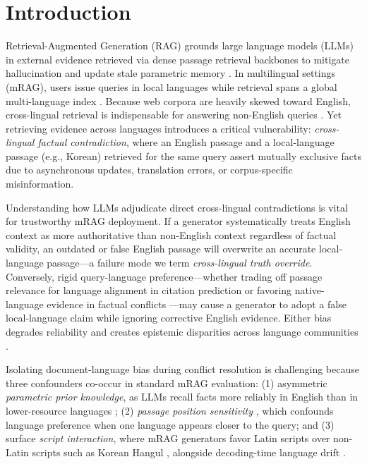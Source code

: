 \section{Introduction}
\label{sec:intro}

Retrieval-Augmented Generation (RAG) grounds large language models (LLMs) in external evidence retrieved via dense passage retrieval backbones \citep{karpukhin2020dense} to mitigate hallucination and update stale parametric memory \citep{lewis2020retrieval}. In multilingual settings (mRAG), users issue queries in local languages while retrieval spans a global multi-language index \citep{asai2021xor,asai2021one,chirkova2024retrieval}. Because web corpora are heavily skewed toward English, cross-lingual retrieval is indispensable for answering non-English queries \citep{wu2024not,liu2025xrag}. Yet retrieving evidence across languages introduces a critical vulnerability: \emph{cross-lingual factual contradiction}, where an English passage and a local-language passage (e.g., Korean) retrieved for the same query assert mutually exclusive facts due to asynchronous updates, translation errors, or corpus-specific misinformation.

Understanding how LLMs adjudicate direct cross-lingual contradictions is vital for trustworthy mRAG deployment. If a generator systematically treats English context as more authoritative than non-English context regardless of factual validity, an outdated or false English passage will overwrite an accurate local-language passage---a failure mode we term \emph{cross-lingual truth override}. Conversely, rigid query-language preference---whether trading off passage relevance for language alignment in citation prediction \citep{ki2025linguistic} or favoring native-language evidence in factual conflicts \citep{wu2024not,sharma2025faux}---may cause a generator to adopt a false local-language claim while ignoring corrective English evidence. Either bias degrades reliability and creates epistemic disparities across language communities \citep{sharma2025faux}.

Isolating document-language bias during conflict resolution is challenging because three confounders co-occur in standard mRAG evaluation: (1) asymmetric \emph{parametric prior knowledge}, as LLMs recall facts more reliably in English than in lower-resource languages \citep{qi2023crosslingual,wang2025lost}; (2) \emph{passage position sensitivity} \citep{liu2024lost}, which confounds language preference when one language appears closer to the query; and (3) surface \emph{script interaction}, where mRAG generators favor Latin scripts over non-Latin scripts such as Korean Hangul \citep{park2025investigating,asai2022mia}, alongside decoding-time language drift \citep{li2025language}.


